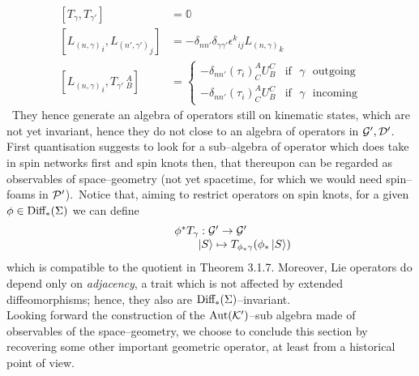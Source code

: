 \begin{equation}\label{commutator}
    \begin{split}
        \left[T_{\gamma},T_{\gamma'}\right]&=\mathbb{0}\\
        \left[{L_{(n,\gamma)}}_i,{L_{(n',\gamma')}}_j\right]&=-\delta_{nn'}\delta_{\gamma\gamma'}{\epsilon^k}_{ij}{L_{(n,\gamma)}}_k\\
        \left[{L_{(n,\gamma)}}_i,T_{\gamma'}\,^A_B\right]&=\begin{cases}
    -\delta_{nn'}(\tau_i)^A_CU^C_B&\text{if $\,\,\gamma\,\,$ outgoing}\\
    -\delta_{nn'}(\tau_i)^A_CU^C_B&\text{if $\,\,\gamma\,\,$ incoming}
\end{cases}
    \end{split}
\end{equation}
\,\newline
They hence generate an algebra of operators still on kinematic states, which are not yet invariant, hence they do not close to an algebra of operators in $\mathcal{G}',\mathcal{D}'$. First quantisation suggests to look for a sub--algebra of operator which does take in spin networks first and spin knots then, that thereupon can be regarded as observables of space--geometry (not yet spacetime, for which we would need spin--foams in $\mathcal{P}'$).\, Notice that, aiming to restrict operators on spin knots, for a given $\phi\in\text{\normalfont Diff}_*(\Sigma)$ we can define
$$\begin{matrix}
    \phi^*T_\gamma:\mathcal{G}'\to\mathcal{G}'\\
    \qquad\qquad\qquad\left| S \right >\mapsto T_{\phi_*\gamma}(\phi_*\left| S \right >)
\end{matrix}$$
which is compatible to the quotient in Theorem 3.1.7. Moreover, Lie operators do depend only on \emph{adjacency}, a trait which is not affected by extended diffeomorphisms; hence, they also are $\text{\normalfont Diff}_*(\Sigma)$--invariant.\\

Looking forward the construction of the $\text{\normalfont Aut}(\mathcal{K}')$--sub algebra made of observables of the space--geometry, we choose to conclude this section by recovering some other important geometric operator, at least from a historical point of view.



